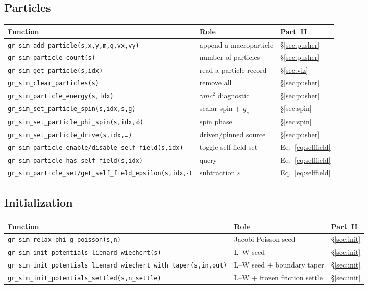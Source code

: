 \documentclass[11pt]{article}
\begin{document}
\subsection{Particles}
\nopagebreak
{\footnotesize
\begin{tabular}{@{}F{8.2cm}L{4.9cm}L{1.4cm}@{}}
\toprule
\textbf{Function} & \textbf{Role} & \textbf{Part~II} \\
\midrule
\texttt{gr\_sim\_add\_particle(s,x,y,m,q,vx,vy)} & append a macroparticle & \S\ref{sec:pusher} \\
\texttt{gr\_sim\_particle\_count(s)} & number of particles & \S\ref{sec:pusher} \\
\texttt{gr\_sim\_get\_particle(s,idx)} & read a particle record & \S\ref{sec:viz} \\
\texttt{gr\_sim\_clear\_particles(s)} & remove all & \S\ref{sec:pusher} \\
\texttt{gr\_sim\_particle\_energy(s,idx)} & $\gamma m c^2$ diagnostic & \S\ref{sec:pusher} \\
\texttt{gr\_sim\_set\_particle\_spin(s,idx,s,g)} & scalar spin + $g_s$ & \S\ref{sec:spin} \\
\texttt{gr\_sim\_set\_particle\_phi\_spin(s,idx,$\phi$)} & spin phase & \S\ref{sec:spin} \\
\texttt{gr\_sim\_set\_particle\_drive(s,idx,\dots)} & driven/pinned source & \S\ref{sec:pusher} \\
\texttt{gr\_sim\_particle\_enable/disable\_self\_field(s,idx)} & toggle self-field set & Eq.~\eqref{eq:selffield} \\
\texttt{gr\_sim\_particle\_has\_self\_field(s,idx)} & query & Eq.~\eqref{eq:selffield} \\
\texttt{gr\_sim\_particle\_set/get\_self\_field\_epsilon(s,idx,$\cdot$)} & subtraction $\varepsilon$ & Eq.~\eqref{eq:selffield} \\
\bottomrule
\end{tabular}}

\subsection{Initialization}
\nopagebreak
{\footnotesize
\begin{tabular}{@{}F{8.2cm}L{4.9cm}L{1.4cm}@{}}
\toprule
\textbf{Function} & \textbf{Role} & \textbf{Part~II} \\
\midrule
\texttt{gr\_sim\_relax\_phi\_g\_poisson(s,n)} & Jacobi Poisson seed & \S\ref{sec:init} \\
\texttt{gr\_sim\_init\_potentials\_lienard\_wiechert(s)} & L--W seed & \S\ref{sec:init} \\
\texttt{gr\_sim\_init\_potentials\_lienard\_wiechert\_with\_taper(s,in,out)} & L--W seed + boundary taper & \S\ref{sec:init} \\
\texttt{gr\_sim\_init\_potentials\_settled(s,n\_settle)} & L--W + frozen friction settle & \S\ref{sec:init} \\
\bottomrule
\end{tabular}}
\end{document}
